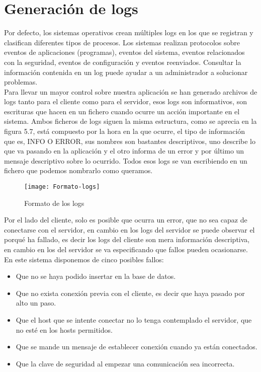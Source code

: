\documentclass[ spanish, a4paper, 12pt, oneside]{report}
\begin{document}
\section{Generación de logs}
Por defecto, los sistemas operativos crean múltiples logs en los que se registran y clasifican diferentes tipos de procesos. Los sistemas realizan protocolos sobre eventos de aplicaciones (programas), eventos del sistema, eventos relacionados 
con la seguridad, eventos de configuración y eventos reenviados. Consultar la información contenida en un log puede ayudar a un administrador a solucionar problemas.\\

Para llevar un mayor control sobre nuestra aplicación se han generado archivos de logs tanto para el cliente como para el servidor, esos logs son informativos, son escrituras que hacen en un fichero cuando ocurre un acción importante en el sistema. 
Ambos ficheros de logs siguen la misma estructura, como se aprecia en la figura 5.7, está compuesto por la hora en la que ocurre, el tipo de información que es, INFO O ERROR, sus nombres son bastantes descriptivos, uno describe lo que va pasando en la aplicación 
y el otro informa de un error y por último un mensaje descriptivo sobre lo ocurrido. Todos esos logs se van escribiendo en un fichero que podemos nombrarlo como queramos. \\

\begin{figure}[!h]
   \centering
   \texttt{[image: Formato-logs]}\\
      \caption{\label{fig: Formato de los logs} Formato de los logs}
\end{figure}

Por el lado del cliente, solo es posible que ocurra un error, que no sea capaz de conectarse con el servidor, en cambio en los logs del servidor se puede observar el porqué ha fallado, es decir los logs del cliente son mera información descriptiva, en cambio en los del servidor 
se va especificando que fallos pueden ocasionarse. En este sistema disponemos de cinco posibles fallos: \\


\begin{itemize}
   \item Que no se haya podido insertar en la base de datos.
   \item Que no exista conexión previa con el cliente, es decir que haya pasado por alto un paso.
   \item Que el host que se intente conectar no lo tenga contemplado el servidor, que no esté en los hosts permitidos.
   \item Que se mande un mensaje de establecer conexión cuando ya están conectados.
   \item Que la clave de seguridad al empezar una comunicación sea incorrecta.
\end{itemize}
\end{document}
